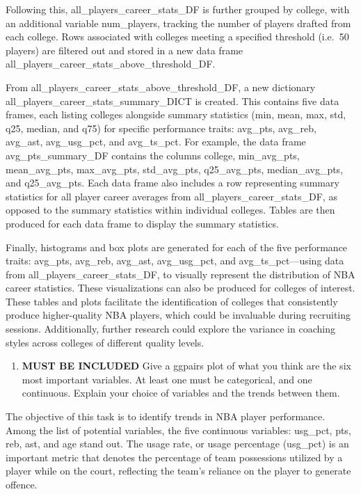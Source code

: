 \documentclass[
]{article}
\providecommand{\tightlist}{%
  \setlength{\itemsep}{0pt}\setlength{\parskip}{0pt}}
\begin{document}
Following this, all\_players\_career\_stats\_DF is further grouped by
college, with an additional variable num\_players, tracking the number
of players drafted from each college. Rows associated with colleges
meeting a specified threshold (i.e.~50 players) are filtered out and
stored in a new data frame
all\_players\_career\_stats\_above\_threshold\_DF.

From all\_players\_career\_stats\_above\_threshold\_DF, a new dictionary
all\_players\_career\_stats\_summary\_DICT is created. This contains
five data frames, each listing colleges alongside summary statistics
(min, mean, max, std, q25, median, and q75) for specific performance
traits: avg\_pts, avg\_reb, avg\_ast, avg\_usg\_pct, and avg\_ts\_pct.
For example, the data frame avg\_pts\_summary\_DF contains the columns
college, min\_avg\_pts, mean\_avg\_pts, max\_avg\_pts, std\_avg\_pts,
q25\_avg\_pts, median\_avg\_pts, and q25\_avg\_pts. Each data frame also
includes a row representing summary statistics for all player career
averages from all\_players\_career\_stats\_DF, as opposed to the summary
statistics within individual colleges. Tables are then produced for each
data frame to display the summary statistics.

Finally, histograms and box plots are generated for each of the five
performance traits: avg\_pts, avg\_reb, avg\_ast, avg\_usg\_pct, and
avg\_ts\_pct---using data from all\_players\_career\_stats\_DF, to
visually represent the distribution of NBA career statistics. These
visualizations can also be produced for colleges of interest. These
tables and plots facilitate the identification of colleges that
consistently produce higher-quality NBA players, which could be
invaluable during recruiting sessions. Additionally, further research
could explore the variance in coaching styles across colleges of
different quality levels.

\vspace{2cm}
\newpage

\begin{enumerate}
\def\labelenumi{\arabic{enumi})}
\setcounter{enumi}{1}
\tightlist
\item
  \textbf{MUST BE INCLUDED} Give a ggpairs plot of what you think are
  the six most important variables. At least one must be categorical,
  and one continuous. Explain your choice of variables and the trends
  between them.
\end{enumerate}

The objective of this task is to identify trends in NBA player
performance. Among the list of potential variables, the five continuous
variables: usg\_pct, pts, reb, ast, and age stand out. The usage rate,
or usage percentage (usg\_pct) is an important metric that denotes the
percentage of team possessions utilized by a player while on the court,
reflecting the team's reliance on the player to generate offence.
\end{document}
